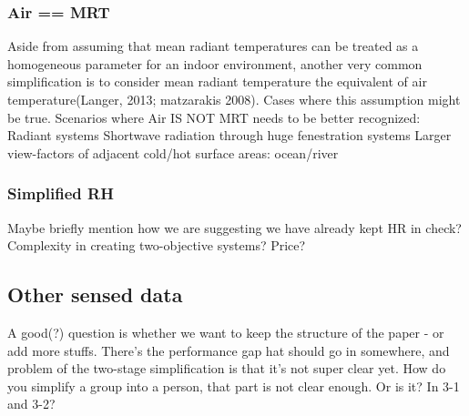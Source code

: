 \subsubsection{Air == MRT}
    Aside from assuming that mean radiant temperatures can be treated as a homogeneous parameter for an indoor environment, another very common simplification is to consider mean radiant temperature the equivalent of air temperature\cite{kantor_most_2011,}(Langer, 2013; matzarakis 2008). 
            Cases where this assumption might be true.
            Scenarios where Air IS NOT MRT needs to be better recognized:
            Radiant systems
            Shortwave radiation through huge fenestration systems
            Larger view-factors of adjacent cold/hot surface areas: ocean/river
\subsubsection{Simplified RH}
            Maybe briefly mention how we are suggesting we have already kept HR in check?
            Complexity in creating two-objective systems? Price?
\subsection{Other sensed data}
    A good(?) question is whether we want to keep the structure of the paper - or add more stuffs. There's the performance gap hat should go in somewhere, and problem of the two-stage simplification is that it's not super clear yet. How do you simplify a group into a person, that part is not clear enough. Or is it? In 3-1 and 3-2?
